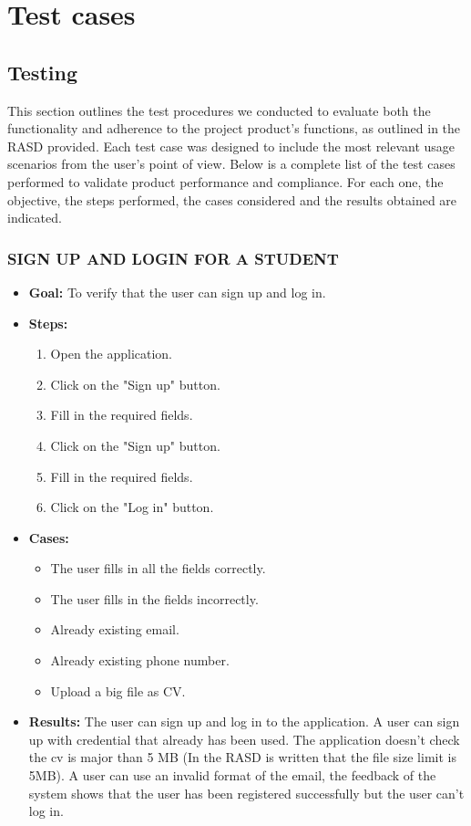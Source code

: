 \chapter{Test cases}

\section{Testing}
This section outlines the test procedures we conducted to evaluate both the functionality and adherence to the project product's functions, as outlined in the RASD provided.
Each test case was designed to include the most relevant usage scenarios from the user's point of view.
Below is a complete list of the test cases performed to validate product performance and compliance.
For each one, the objective, the steps performed, the cases considered and the results obtained are indicated.

\subsection{SIGN UP AND LOGIN FOR A STUDENT}\label{subsec:sign-up-and-login-for-a-student}
\begin{itemize}
    \item \textbf{Goal:} To verify that the user can sign up and log in.

    \item \textbf{Steps:}
    \begin{enumerate}
        \item Open the application.
        \item Click on the "Sign up" button.
        \item Fill in the required fields.
        \item Click on the "Sign up" button.
        \item  Fill in the required fields.
        \item Click on the "Log in" button.
    \end{enumerate}
    \item \textbf{Cases:}
    \begin{itemize}
        \item The user fills in all the fields correctly.
        \item The user fills in the fields incorrectly.
        \item Already existing email.
        \item Already existing phone number.
        \item Upload a big file as CV.
    \end{itemize}
    \item \textbf{Results:} The user can sign up and log in to the application.
    A user can sign up with credential that already has been used.
    The application doesn't check the cv is major than 5 MB (In the RASD is written that the file size limit is 5MB).
    A user can use an invalid format of the email, the feedback of the system shows that the user has been registered successfully but the user can't log in.
    \end{itemize}

